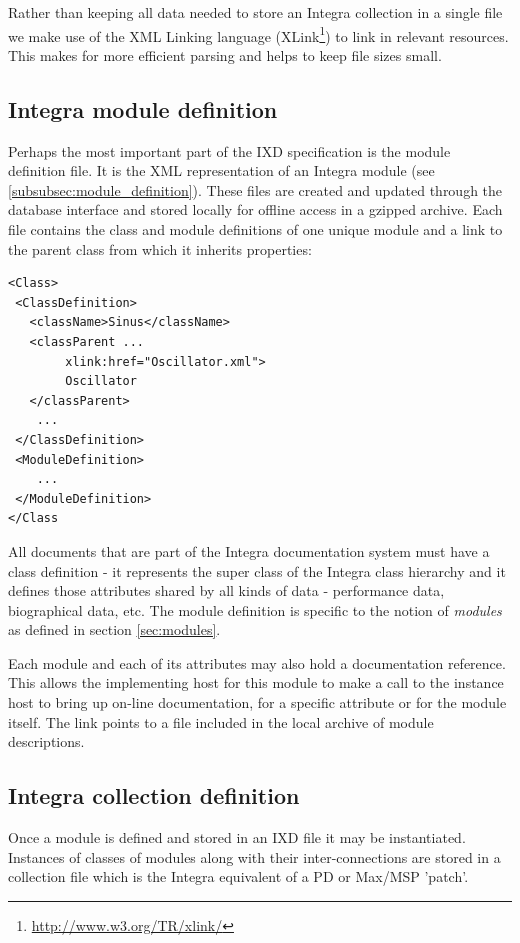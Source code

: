 \documentclass{article}
\begin{document}
Rather than keeping all data needed to store an Integra collection in a single file we make use of the XML Linking language (XLink\footnote{\url{http://www.w3.org/TR/xlink/}}) to link in relevant resources. This makes for more efficient parsing and helps to keep file sizes small.

\subsection{Integra module definition}\label{subsect:integra_class_definition}

Perhaps the most important part of the IXD specification is the module definition file. It is the XML representation of an Integra module (see \ref{subsubsec:module_definition}). These files are created and updated through the database interface and stored locally for offline access in a gzipped archive. Each file contains the class and module definitions of one unique module and a link to the parent class from which it inherits properties:

{\small
\begin{verbatim}
<Class>
 <ClassDefinition>
   <className>Sinus</className>
   <classParent ...
        xlink:href="Oscillator.xml">
        Oscillator
   </classParent>
    ...
 </ClassDefinition>
 <ModuleDefinition>
    ...
 </ModuleDefinition>
</Class
\end{verbatim}
}
All documents that are part of the Integra documentation system must have a class definition - it represents the super class of the Integra class hierarchy and it defines those attributes shared by all kinds of data - performance data, biographical data, etc. The module definition is specific to the notion of \emph{modules} as defined in section \ref{sec:modules}.

Each module and each of its attributes may also hold a documentation
reference. This allows the implementing host for this module to make a
call to the instance host to bring up on-line documentation, for a
specific attribute or for the module itself. The link points to a file
included in the local archive of module descriptions.

\subsection{Integra collection definition}\label{subsect:integra_collection_definition}

Once a module is defined and stored in an IXD file it may be instantiated. Instances of classes of modules along with their inter-connections are stored in a collection file which is the Integra equivalent of a PD or Max/MSP 'patch'.
\end{document}
